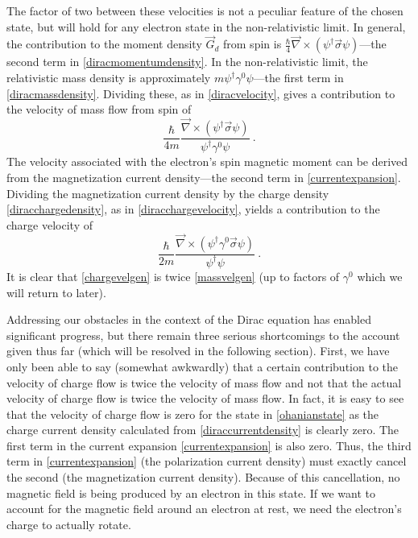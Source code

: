 \documentclass[12pt,secnumarabic,amsmath,amssymb,balancelastpage,nofootinbib]{article}
\begin{document}
The factor of two between these velocities is not a peculiar feature of the chosen state, but will hold for any electron state in the non-relativistic limit.  In general, the contribution to the moment density $\vec{G}_d$ from spin is $\frac{\hbar}{4}\vec{\nabla}\times(\psi^\dagger \vec{\sigma} \psi)$---the second term in \eqref{diracmomentumdensity}.  In the non-relativistic limit, the relativistic mass density is approximately $m \psi^\dagger\gamma^0\psi$---the first term in \eqref{diracmassdensity}.  Dividing these, as in \eqref{diracvelocity}, gives a contribution to the velocity of mass flow from spin of
\begin{equation}
\frac{\hbar}{4 m} \frac{\vec{\nabla}\times(\psi^\dagger \vec{\sigma} \psi)}{\psi^\dagger\gamma^0\psi}\ .
\label{massvelgen}
\end{equation}
The velocity associated with the electron's spin magnetic moment can be derived from the magnetization current density---the second term in \eqref{currentexpansion}.  Dividing the magnetization current density by the charge density \eqref{diracchargedensity}, as in \eqref{diracchargevelocity}, yields a contribution to the charge velocity of
\begin{equation}
\frac{\hbar}{2 m} \frac{\vec{\nabla}\times(\psi^\dagger \gamma^0\vec{\sigma} \psi)}{\psi^\dagger\psi}\ .
\label{chargevelgen}
\end{equation}
It is clear that \eqref{chargevelgen} is twice \eqref{massvelgen} (up to factors of $\gamma^0$ which we will return to later).


Addressing our obstacles in the context of the Dirac equation has enabled significant progress, but there remain three serious shortcomings to the account given thus far (which will be resolved in the following section).  First, we have only been able to say (somewhat awkwardly) that a certain contribution to the velocity of charge flow is twice the velocity of mass flow and not that the actual velocity of charge flow is twice the velocity of mass flow.  In fact, it is easy to see that the velocity of charge flow is zero for the state in \eqref{ohanianstate} as the charge current density calculated from \eqref{diraccurrentdensity} is clearly zero.  The first term in the current expansion \eqref{currentexpansion} is also zero.  Thus, the third term in \eqref{currentexpansion} (the polarization current density) must exactly cancel the second (the magnetization current density).  Because of this cancellation, no magnetic field is being produced by an electron in this state.  If we want to account for the magnetic field around an electron at rest, we need the electron's charge to actually rotate.
\end{document}
